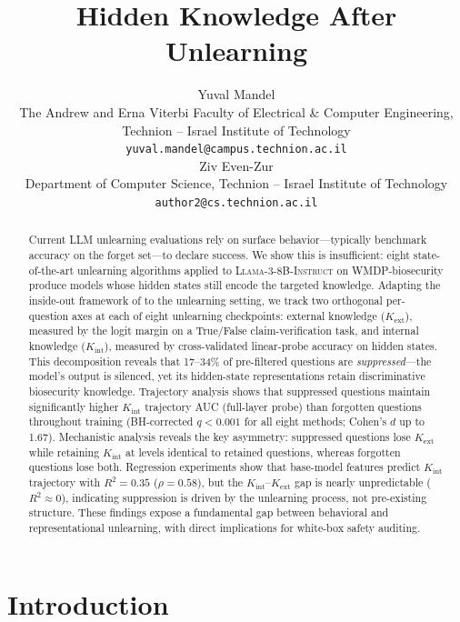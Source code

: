 \documentclass[11pt]{article}
\title{Hidden Knowledge After Unlearning}
\author{Yuval Mandel \\
  The Andrew and Erna Viterbi Faculty of Electrical \& Computer Engineering, \\
  Technion -- Israel Institute of Technology \\
  \texttt{yuval.mandel@campus.technion.ac.il} \\\And
  Ziv Even-Zur \\
  Department of Computer Science, Technion -- Israel Institute of Technology \\
  \texttt{author2@cs.technion.ac.il} \\}
\begin{document}
\maketitle

\begin{abstract}
Current LLM unlearning evaluations rely on surface behavior---typically benchmark
accuracy on the forget set---to declare success.
We show this is insufficient: eight state-of-the-art unlearning algorithms applied
to \textsc{Llama-3-8B-Instruct} on WMDP-biosecurity produce models whose hidden
states still encode the targeted knowledge.
Adapting the inside-out framework of \citet{gekhman2025insideout} to the unlearning
setting, we track two orthogonal per-question axes at each of eight unlearning
checkpoints: external knowledge ($K_\text{ext}$), measured by the logit margin on
a True/False claim-verification task, and internal knowledge ($K_\text{int}$),
measured by cross-validated linear-probe accuracy on hidden states.
This decomposition reveals that 17--34\% of pre-filtered questions are
\emph{suppressed}---the model's output is silenced, yet its hidden-state
representations retain discriminative biosecurity knowledge.
Trajectory analysis shows that suppressed questions maintain significantly higher
$K_\text{int}$ trajectory AUC (full-layer probe) than forgotten questions throughout training
(BH-corrected $q < 0.001$ for all eight methods; Cohen's $d$ up to 1.67).
Mechanistic analysis reveals the key asymmetry: suppressed questions lose
$K_\text{ext}$ while retaining $K_\text{int}$ at levels identical to retained
questions, whereas forgotten questions lose both.
Regression experiments show that base-model features predict $K_\text{int}$
trajectory with $R^2 = 0.35$ ($\rho = 0.58$), but the $K_\text{int}$--$K_\text{ext}$
gap is nearly unpredictable ($R^2 \approx 0$), indicating suppression is driven
by the unlearning process, not pre-existing structure.
These findings expose a fundamental gap between behavioral and representational
unlearning, with direct implications for white-box safety auditing.
\end{abstract}

\section{Introduction}
\label{sec:intro}
\end{document}
